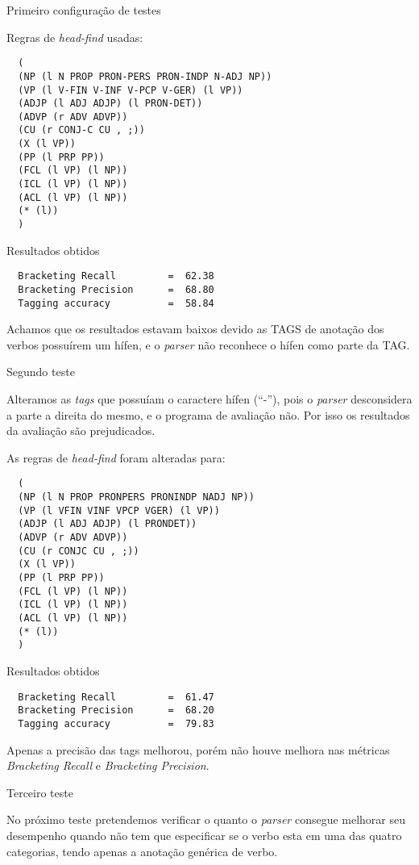 
Primeiro configuração de testes

Regras de \emph{head-find} usadas:

\scriptsize
\begin{verbatim}
  (
  (NP (l N PROP PRON-PERS PRON-INDP N-ADJ NP))
  (VP (l V-FIN V-INF V-PCP V-GER) (l VP))
  (ADJP (l ADJ ADJP) (l PRON-DET))
  (ADVP (r ADV ADVP))
  (CU (r CONJ-C CU , ;))
  (X (l VP))
  (PP (l PRP PP))
  (FCL (l VP) (l NP))
  (ICL (l VP) (l NP))
  (ACL (l VP) (l NP))
  (* (l))
  )
\end{verbatim}

Resultados obtidos

\begin{verbatim}
  Bracketing Recall         =  62.38
  Bracketing Precision      =  68.80
  Tagging accuracy          =  58.84
\end{verbatim}

\normalsize
Achamos que os resultados estavam baixos devido as TAGS de anotação dos verbos possuírem um hífen, e o \emph{parser} não reconhece o hífen como parte da TAG.

Segundo teste

Alteramos as \emph{tags} que possuíam o caractere hífen (``-''), pois o \emph{parser} desconsidera a parte a direita do mesmo, e o programa de avaliação não. Por isso os resultados da avaliação são prejudicados.

As regras de \emph{head-find} foram alteradas para:

\scriptsize
\begin{verbatim}
  (
  (NP (l N PROP PRONPERS PRONINDP NADJ NP))
  (VP (l VFIN VINF VPCP VGER) (l VP))
  (ADJP (l ADJ ADJP) (l PRONDET))
  (ADVP (r ADV ADVP))
  (CU (r CONJC CU , ;))
  (X (l VP))
  (PP (l PRP PP))
  (FCL (l VP) (l NP))
  (ICL (l VP) (l NP))
  (ACL (l VP) (l NP))
  (* (l))
  )
\end{verbatim}

Resultados obtidos

\begin{verbatim}
  Bracketing Recall         =  61.47
  Bracketing Precision      =  68.20
  Tagging accuracy          =  79.83
\end{verbatim}

\normalsize
Apenas a precisão das tags melhorou, porém não houve melhora nas métricas \emph{Bracketing Recall} e \emph{Bracketing Precision}.

Terceiro teste

No próximo teste pretendemos verificar o quanto o \emph{parser} consegue melhorar seu desempenho quando não tem que especificar se o verbo esta em uma das quatro categorias, tendo apenas a anotação genérica de verbo.

